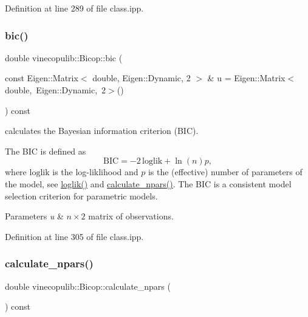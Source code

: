 Definition at line 289 of file class.\+ipp.

\mbox{\label{classvinecopulib_1_1_bicop_a5ad96c73be4b32846792203a9dee1c53}} 
\subsubsection{\texorpdfstring{bic()}{bic()}}
{\footnotesize\ttfamily double vinecopulib\+::\+Bicop\+::bic (\begin{DoxyParamCaption}\item[{const Eigen\+::\+Matrix$<$ double, Eigen\+::\+Dynamic, 2 $>$ \&}]{u = {\ttfamily Eigen\+:\+:Matrix$<$double,~Eigen\+:\+:Dynamic,~2$>$()} }\end{DoxyParamCaption}) const\hspace{0.3cm}{\ttfamily [inline]}}



calculates the Bayesian information criterion (B\+IC). 

The B\+IC is defined as \[ \mathrm{BIC} = -2\, \mathrm{loglik} + \ln(n) p, \] where $ \mathrm{loglik} $ is the log-\/liklihood and $ p $ is the (effective) number of parameters of the model, see \hyperlink{classvinecopulib_1_1_bicop_a81979ae3578ec9af1f5f956751faa63d}{loglik()} and \hyperlink{classvinecopulib_1_1_bicop_a8e6b3e3dd484d07cafeb24ca3393f5f0}{calculate\+\_\+npars()}. The B\+IC is a consistent model selection criterion for parametric models.


\begin{DoxyParams}{Parameters}
{\em u} & $n \times 2$ matrix of observations. \\
\hline
\end{DoxyParams}


Definition at line 305 of file class.\+ipp.

\mbox{\label{classvinecopulib_1_1_bicop_a8e6b3e3dd484d07cafeb24ca3393f5f0}} 
\subsubsection{\texorpdfstring{calculate\+\_\+npars()}{calculate\_npars()}}
{\footnotesize\ttfamily double vinecopulib\+::\+Bicop\+::calculate\+\_\+npars (\begin{DoxyParamCaption}{ }\end{DoxyParamCaption}) const\hspace{0.3cm}{\ttfamily [inline]}}



